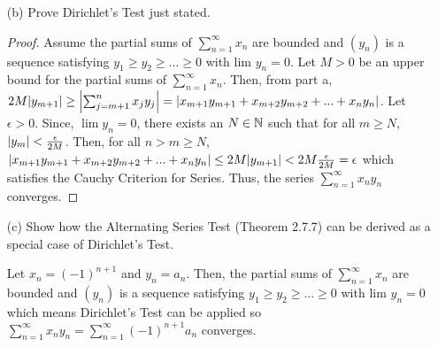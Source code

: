 \documentclass[12pt,letterpaper]{article}
\begin{document}
\begin{itemize}[leftmargin=!,labelindent=5pt]
\begin{itemize}
\begin{proof}
                    \begin{align*}
                        \abs{\sum_{j={m+1}}^n x_jy_j} &= \abs{s_ny_{n+1} - s_my_{m+1} + \sum_{j=m+1}^n s_j(y_j - y_{j+1})}\\
                        &\leq \abs{s_ny_{n+1} - s_my_{m+1}} + \abs{\sum_{j=m+1}^n s_j(y_j - y_{j+1})}\\
                        &\leq s_ny_{n+1} + s_my_{m+1} + \sum_{j=m+1}^n s_j(y_j - y_{j+1})\\
                        &\leq My_{n+1} + My_{m+1} + \sum_{j=m+1}^n M(y_j - y_{j+1})\\
                        &\leq My_{n+1} + My_{m+1} + M(y_{m+1} - y_{n+1}) = 2My_{m+1}
                    \end{align*}
                    So, $\abs{\sum_{j=m+1}^{n} x_j y_j} \leq 2M \abs{y_{m+1}}$ as desired.
                \end{proof}
            \item [(b)] Prove Dirichlet’s Test just stated.
                \begin{proof}
                    Assume the partial sums of $\sum_{n=1}^{\infty} x_n$ are bounded and $(y_n)$ is a sequence satisfying $y_1 \geq y_2 \geq ... \geq 0$ with lim $y_n = 0$.
                    Let $M > 0$ be an upper bound for the partial sums of $\sum_{n=1}^{\infty}x_n$.
                    Then, from part a, $2M \abs{y_{m+1}} \geq \abs{\sum_{j=m+1}^{n} x_j y_j} = \abs{x_{m+1} y_{m+1} + x_{m+2} y_{m+2} + ... + x_{n} y_{n}}$.
                    Let $\epsilon > 0$.
                    Since, $\lim y_n = 0$, there exists an $N \in \mathbb{N}$ such that for all $m \geq N$, $\abs{y_m} < \frac{\epsilon}{2M}$.
                    Then, for all $n > m \geq N$, $\abs{x_{m+1} y_{m+1} + x_{m+2} y_{m+2} + ... + x_{n} y_{n}} \leq 2M \abs{y_{m+1}} < 2M \frac{\epsilon}{2M} = \epsilon$ which satisfies the Cauchy Criterion for Series.
                    Thus, the series $\sum_{n=1}^{\infty} x_n y_n$ converges.
                \end{proof}
            \item [(c)] Show how the Alternating Series Test (Theorem 2.7.7) can be derived as a special case of Dirichlet’s Test.
                
                Let $x_n = (-1)^{n+1}$ and $y_n = a_n$.
                Then, the partial sums of $\sum_{n=1}^{\infty} x_n$ are bounded and $(y_n)$ is a sequence satisfying $y_1 \geq y_2 \geq ... \geq 0$ with lim $y_n = 0$ which means Dirichlet's Test can be applied so $\sum_{n=1}^{\infty} x_n y_n = \sum_{n=1}^{\infty} (-1)^{n+1} a_n$ converges.
        \end{itemize}
\end{itemize}
\end{document}
